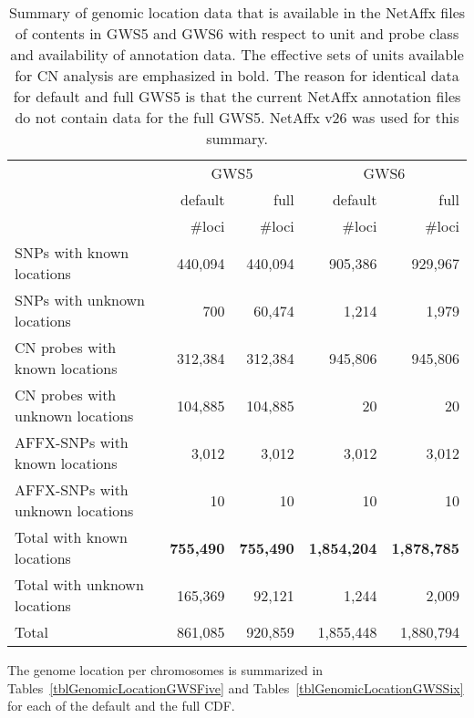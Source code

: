 \documentclass[10pt,a4paper]{article}
\newcommand{\GWSFive}{GWS5\xspace}
\newcommand{\GWSSix}{GWS6\xspace}
\begin{document}
\begin{table}[htp]
\begin{center}
\begin{tabular}{|l||rr||rr|}
\hline
     & \multicolumn{2}{c||}{\GWSFive} & \multicolumn{2}{c|}{\GWSSix} \\
     & default & full & default & full \\
     & \#loci & \#loci & \#loci & \#loci \\
\hline
\hline
SNPs with known locations        & 440,094 &  440,094  &   905,386 &   929,967 \\
SNPs with unknown locations      &     700 &   60,474  &     1,214 &     1,979 \\
\hline
CN probes with known locations   & 312,384 &  312,384  &   945,806 &   945,806 \\
CN probes with unknown locations & 104,885 &  104,885  &        20 &        20 \\
\hline
AFFX-SNPs with known locations   &   3,012 &    3,012  &     3,012 &     3,012 \\
AFFX-SNPs with unknown locations &      10 &       10  &        10 &        10 \\
\hline
Total with known locations       & \textbf{755,490} & \textbf{755,490} & \textbf{1,854,204}  & \textbf{1,878,785} \\
Total with unknown locations     & 165,369 &   92,121  &    1,244  &     2,009 \\
\hline
Total                            & 861,085 &  920,859  & 1,855,448 & 1,880,794 \\
\hline
\end{tabular}
\end{center}
\caption{Summary of genomic location data that is available in the NetAffx files of contents in \GWSFive and \GWSSix with respect to unit and probe class and availability of annotation data.  The effective sets of units available for CN analysis are emphasized in bold.  The reason for identical data for default and full GWS5 is that the current NetAffx annotation files do not contain data for the full GWS5.  NetAffx v26 was used for this summary.}
\label{tblGenomicLocation}
\end{table}

The genome location per chromosomes is summarized in Tables~\ref{tblGenomicLocationGWSFive} and Tables~\ref{tblGenomicLocationGWSSix} for each of the default and the full CDF.
\end{document}
